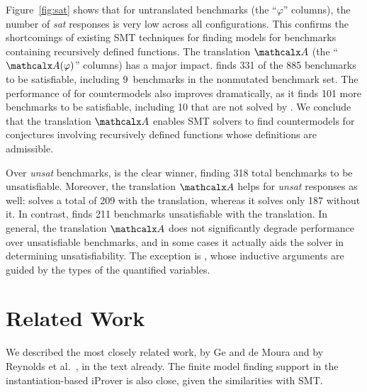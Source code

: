 Figure~\ref{fig:sat} shows that for untranslated benchmarks (the ``$\varphi$''
columns), the number of \emph{sat} responses is very low across all
configurations. This confirms the shortcomings of existing SMT techniques for
finding models for benchmarks containing recursively defined functions.
%
The translation $\conv$ (the ``$\conv(\varphi)$'' columns) has a major
impact. \cvcf finds 331 of the 885 benchmarks to be satisfiable,
including 9~benchmarks in the nonmutated \leon benchmark set. The
performance of \ziiib for countermodels also improves dramatically, as it
finds 101 more benchmarks to be satisfiable, including 10 that are not solved by \cvcf.
%
We conclude that the translation $\conv$ enables SMT
solvers to find countermodels for conjectures involving recursively defined functions
whose definitions are admissible.

Over \emph{unsat} benchmarks, \cvci is the
clear winner, finding 318 total benchmarks to be unsatisfiable. Moreover, the
translation $\conv$ helps \ziii for \emph{unsat} responses as well:
\ziii solves a total of 209 with the translation, whereas it solves only 187 without it.
%
In contrast, \cvcd finds 211 benchmarks unsatisfiable with the translation.
In general, the translation $\conv$ does not significantly degrade performance
over unsatisfiable benchmarks, and in some cases it actually aids the solver 
in determining unsatisfiability. The exception is \cvci, whose inductive
arguments are guided by the types of the quantified variables.

\section{Related Work}

We described the most closely related work, by Ge and de Moura
\cite{GeDeM-CAV-09} and by Reynolds et al.\
\cite{ReyEtAl-1-RR-13,reynolds-et-al-2013}, in the text already.
The finite model finding support in the instantiation-based iProver
\cite{korovin-2013} is also close, given the similarities with SMT.


